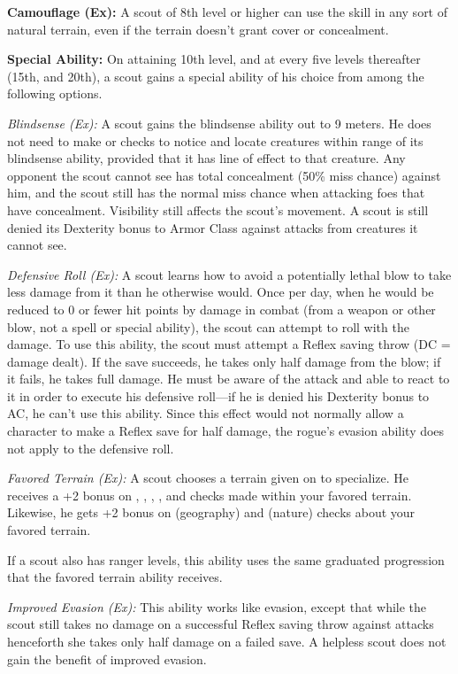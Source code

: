 \textbf{Camouflage (Ex):} A scout of 8th level or higher can use the  skill in any sort of natural terrain, even if the terrain doesn't grant cover or concealment.


\textbf{Special Ability:} On attaining 10th level, and at every five levels thereafter (15th, and 20th), a scout gains a special ability of his choice from among the following options.

\textit{Blindsense (Ex):} A scout gains the blindsense ability out to 9 meters. He does not need to make  or  checks to notice and locate creatures within range of its blindsense ability, provided that it has line of effect to that creature. Any opponent the scout cannot see has total concealment (50\% miss chance) against him, and the scout still has the normal miss chance when attacking foes that have concealment. Visibility still affects the scout's movement. A scout is still denied its Dexterity bonus to Armor Class against attacks from creatures it cannot see.

\textit{Defensive Roll (Ex):} A scout learns how to avoid a potentially lethal blow to take less damage from it than he otherwise would. Once per day, when he would be reduced to 0 or fewer hit points by damage in combat (from a weapon or other blow, not a spell or special ability), the scout can attempt to roll with the damage. To use this ability, the scout must attempt a Reflex saving throw (DC = damage dealt). If the save succeeds, he takes only half damage from the blow; if it fails, he takes full damage. He must be aware of the attack and able to react to it in order to execute his defensive roll---if he is denied his Dexterity bonus to AC, he can't use this ability. Since this effect would not normally allow a character to make a Reflex save for half damage, the rogue's evasion ability does not apply to the defensive roll.

\textit{Favored Terrain (Ex):} A scout chooses a terrain given on  to specialize. He receives a +2 bonus on , , , ,  and  checks made within your favored terrain. Likewise, he gets +2 bonus on  (geography) and  (nature) checks about your favored terrain.

If a scout also has ranger levels, this ability uses the same graduated progression that the favored terrain ability receives.

\textit{Improved Evasion (Ex):} This ability works like evasion, except that while the scout still takes no damage on a successful Reflex saving throw against attacks henceforth she takes only half damage on a failed save. A helpless scout does not gain the benefit of improved evasion.

